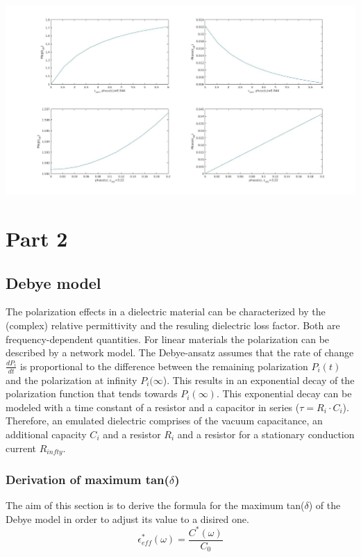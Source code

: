 \begin{center}
	\includegraphics[width=\textwidth]{figures/Theory/layeredepsilon.jpg}
	
	\end{center}
	
	
	
\section{Part 2}


\subsection{Debye model}
The polarization effects in a dielectric material can be characterized by the (complex) relative permittivity and the resuling dielectric loss factor. Both are frequency-dependent quantities. 
For linear materials the polarization can be described by a network model. The Debye-ansatz assumes that the rate of change $ \frac{dP_i}{dt}$ is proportional to the difference between the remaining polarization $P_i(t)$ and the polarization at infinity $P_i(\infty$). This results in an exponential decay of the polarization function that tends towards $P_i(\infty)$. This exponential decay can be modeled with a time constant of a resistor and a capacitor in series ($\tau=R_i \cdot C_i$). Therefore, an emulated dielectric comprises of the vacuum capacitance, an additional capacity $C_i$ and a resistor $R_i$ and a resistor for a stationary conduction current $R_{infty}$. 

\subsubsection{Derivation of maximum tan($\delta$)}
The aim of this section is to derive the formula for the maximum tan($\delta$) of the Debye model in order to adjust its value to a disired one.
\begin{equation}
\epsilon_{eff}^* (\omega) = \frac{C^*(\omega)}{C_0}
\end{equation}

